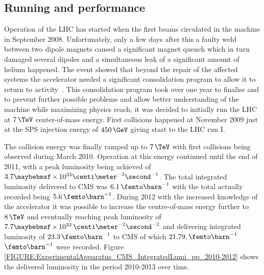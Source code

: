 \subsection{Running and performance}
\label{SUBSECTION:ExperimentalApparatus_CMS_RunningAndPerformance}


Operation of the \gls{LHC} has started when the first beams circulated in the machine in September 2008. Unfortunately, only a few days after this a faulty weld between two dipole magnets caused a significant magnet quench which in turn damaged several dipoles and a simultaneous leak of a significant amount of helium happened. The event showed that beyond the repair of the affected systems the accelerator needed a significant consolidation program to allow it to return to activity~\cite{ARTICLE:CMSReportIncident19Sep2008}. This consolidation program took over one year to finalise and to prevent further possible problems and allow better understanding of the machine while maximizing physics reach, it was decided to initially run the \gls{LHC} at $7\,\TeV$ center-of-mass energy.
First collisions happened at November 2009 just at the \gls{SPS} injection energy of $450\,\GeV$ giving start to the \gls{LHC} run I.

The collision energy was finally ramped up to $7\,\TeV$ with first collisions being observed during March 2010. Operation at this energy continued until the end of 2011, with a peak luminosity being achieved of $3.7 \times 10^{33} \centi\meter^{-2}\second^{-1}$. The total integrated luminosity delivered to \gls{CMS} was $6.1\,\femto\barn^{-1}$ with the total actually recorded being $5.6\,\femto\barn^{-1}$. During 2012 with the increased knowledge of the accelerator it was possible to increase the centre-of-mass energy further to $8\,\TeV$ and eventually reaching peak luminosity of $7.7 \times 10^{33}\,\centi\meter^{-2}\second^{-2}$ and delivering integrated luminosity of $23.3\,\femto\barn^{-1}$ to \gls{CMS} of which $21.79,\femto\barn^{-1}$  $\femto\barn^{-1}$ were recorded. Figure \ref{FIGURE:ExperimentalApparatus_CMS_IntegratedLumi_pp_2010-2012} shows the delivered luminosity in the period 2010-2013 over time.

